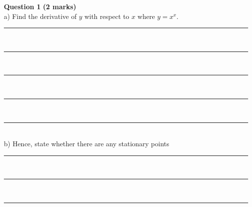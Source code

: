 \documentclass[a4paper,12pt]{article}
\begin{document}
\noindent \textbf{Question 1} \hfill \textbf{(2 marks)} \\[0.3cm]
a) Find the derivative of \( y \) with respect to \( x \) where \( y = x^x \). \hfill {} \\[1cm]
\rule{\textwidth}{0.5pt} \\[0.7cm]
\rule{\textwidth}{0.5pt} \\[0.7cm]
\rule{\textwidth}{0.5pt} \\[0.7cm]
\rule{\textwidth}{0.5pt} \\[0.7cm]
\rule{\textwidth}{0.5pt} \\[2cm]
b) Hence, state whether there are any stationary points \hfill {} \\[1cm]
\rule{\textwidth}{0.5pt} \\[0.7cm]
\rule{\textwidth}{0.5pt} \\[0.7cm]
\rule{\textwidth}{0.5pt} \\[2cm]
\end{document}
